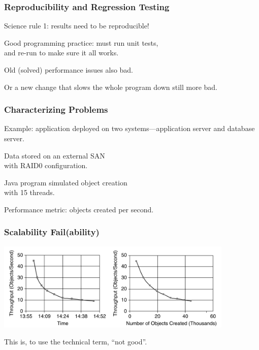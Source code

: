 \begin{frame}
\frametitle{Reproducibility and Regression Testing}

\large
\begin{changemargin}{2cm}
Science rule 1: results need to be reproducible!

Good programming practice: must run unit tests,\\
and re-run to make sure it all works. 

Old (solved) performance issues also bad.

Or a new change that slows the whole program down still more bad.
\end{changemargin}
\end{frame}



\begin{frame}
\frametitle{Characterizing Problems}

\large
\begin{changemargin}{2cm}
Example: application deployed on two systems---application server and database server. 

Data stored on an external SAN \\
with RAID0 configuration. 

Java program simulated object creation\\
with 15 threads. 

Performance metric: objects created per second. 
\end{changemargin}

\end{frame}



\begin{frame}
\frametitle{Scalability Fail(ability)}

\begin{center}
	\includegraphics[width=0.85\textwidth]{images/batch-job-scalability.png}
\end{center}

\Large
\begin{changemargin}{1cm}
This is, to use the technical term, ``not good''.
\end{changemargin}
\end{frame}



